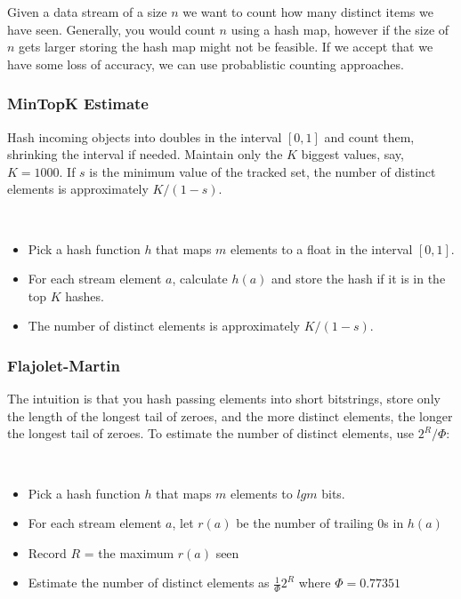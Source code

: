 Given a data stream of a size $n$ we want to count how many distinct
items we have seen. Generally, you would count $n$ using a hash map,
however if the size of $n$ gets larger storing the hash map might not
be feasible. If we accept that we have some loss of accuracy, we can
use probablistic
counting approaches.

\subsubsection{MinTopK Estimate}

Hash incoming objects into doubles in the interval $[0, 1]$ and count
them, shrinking the interval if needed. Maintain only the $K$ biggest
values, say, $K = 1000$. If $s$ is the minimum value of the tracked set,
the number of distinct elements is approximately $K / (1 - s)$.

\begin{definition}
  ~
  \begin{itemize}
    \item Pick a hash function $h$ that maps $m$ elements to a float
      in the interval $[0, 1]$.
    \item For each stream element $a$, calculate $h(a)$ and store the hash if it
      is in the top $K$ hashes.
    \item The number of distinct elements is approximately $K / (1 - s)$.
  \end{itemize}
\end{definition}

\subsubsection{Flajolet-Martin}

The intuition is that you hash passing elements into short bitstrings,
store only the length of the longest tail of zeroes, and the more distinct
elements, the longer the longest tail of zeroes. To estimate the number
of distinct elements, use $2^R / \Phi$:

\begin{definition}
  ~
  \begin{itemize}
    \item Pick a hash function $h$ that maps $m$ elements to $lg m$ bits.
    \item For each stream element $a$, let $r(a)$ be the number of
      trailing $0$s in $h(a)$
    \item Record $R$ = the maximum $r(a)$ seen
    \item Estimate the number of distinct elements as $\frac{1}{\Phi}
      2^R$ where $\Phi = 0.77351$
  \end{itemize}
\end{definition}

